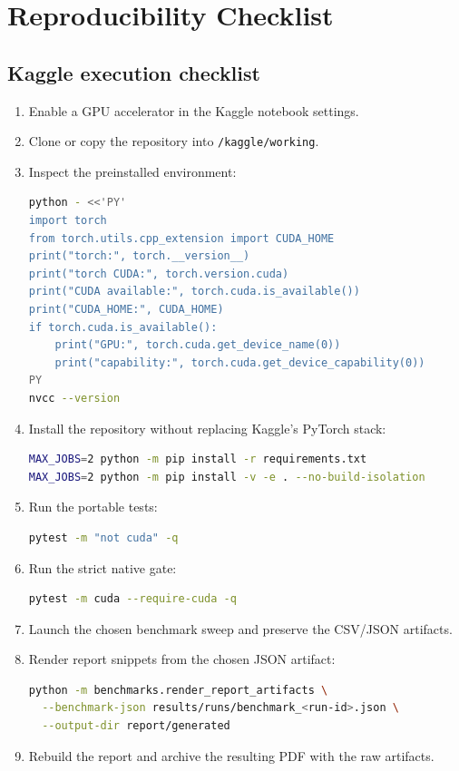 \chapter{Reproducibility Checklist}
\label{app:reproducibility}

\section{Kaggle execution checklist}

\begin{enumerate}
  \item Enable a GPU accelerator in the Kaggle notebook settings.
  \item Clone or copy the repository into \texttt{/kaggle/working}.
  \item Inspect the preinstalled environment:
\begin{lstlisting}[language=bash]
python - <<'PY'
import torch
from torch.utils.cpp_extension import CUDA_HOME
print("torch:", torch.__version__)
print("torch CUDA:", torch.version.cuda)
print("CUDA available:", torch.cuda.is_available())
print("CUDA_HOME:", CUDA_HOME)
if torch.cuda.is_available():
    print("GPU:", torch.cuda.get_device_name(0))
    print("capability:", torch.cuda.get_device_capability(0))
PY
nvcc --version
\end{lstlisting}
  \item Install the repository without replacing Kaggle's PyTorch stack:
\begin{lstlisting}[language=bash]
MAX_JOBS=2 python -m pip install -r requirements.txt
MAX_JOBS=2 python -m pip install -v -e . --no-build-isolation
\end{lstlisting}
  \item Run the portable tests:
\begin{lstlisting}[language=bash]
pytest -m "not cuda" -q
\end{lstlisting}
  \item Run the strict native gate:
\begin{lstlisting}[language=bash]
pytest -m cuda --require-cuda -q
\end{lstlisting}
  \item Launch the chosen benchmark sweep and preserve the CSV/JSON artifacts.
  \item Render report snippets from the chosen JSON artifact:
\begin{lstlisting}[language=bash]
python -m benchmarks.render_report_artifacts \
  --benchmark-json results/runs/benchmark_<run-id>.json \
  --output-dir report/generated
\end{lstlisting}
  \item Rebuild the report and archive the resulting PDF with the raw artifacts.
\end{enumerate}


